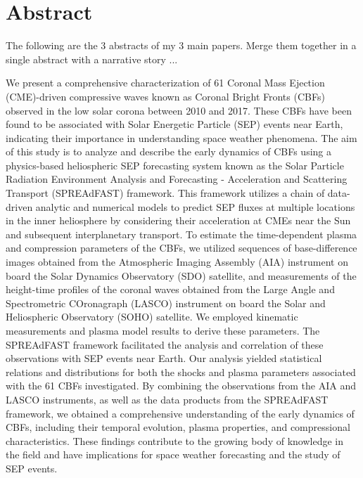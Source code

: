 \documentclass[12pt, a4paper]{report}
\begin{document}



\chapter*{Abstract}
The following are the 3 abstracts of my 3 main papers. Merge them together in a single abstract with a narrative story ...

We present a comprehensive characterization of 61 Coronal Mass Ejection (CME)-driven compressive waves known as Coronal Bright Fronts (CBFs) observed in the low solar corona between 2010 and 2017. These CBFs have been found to be associated with Solar Energetic Particle (SEP) events near Earth, indicating their importance in understanding space weather phenomena.
The aim of this study is to analyze and describe the early dynamics of CBFs using a physics-based heliospheric SEP forecasting system known as the Solar Particle Radiation Environment Analysis and Forecasting - Acceleration and Scattering Transport (SPREAdFAST) framework. This framework utilizes a chain of data-driven analytic and numerical models to predict SEP fluxes at multiple locations in the inner heliosphere by considering their acceleration at CMEs near the Sun and subsequent interplanetary transport.
To estimate the time-dependent plasma and compression parameters of the CBFs, we utilized sequences of base-difference images obtained from the Atmospheric Imaging Assembly (AIA) instrument on board the Solar Dynamics Observatory (SDO) satellite, and measurements of the height-time profiles of the coronal waves obtained from the Large Angle and Spectrometric COronagraph (LASCO) instrument on board the Solar and Heliospheric Observatory (SOHO) satellite. We employed kinematic measurements and plasma model results to derive these parameters. The SPREAdFAST framework facilitated the analysis and correlation of these observations with SEP events near Earth.
Our analysis yielded statistical relations and distributions for both the shocks and plasma parameters associated with the 61 CBFs investigated. By combining the observations from the AIA and LASCO instruments, as well as the data products from the SPREAdFAST framework, we obtained a comprehensive understanding of the early dynamics of CBFs, including their temporal evolution, plasma properties, and compressional characteristics. These findings contribute to the growing body of knowledge in the field and have implications for space weather forecasting and the study of SEP events.
\end{document}
